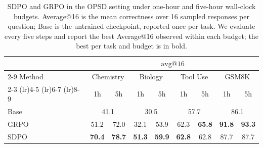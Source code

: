 \begin{table}[t]
    \centering
    \small
    \setlength{\tabcolsep}{3.5pt}
    \renewcommand{\arraystretch}{1.15}
    \caption{
    SDPO and GRPO in the OPSD setting under one-hour and five-hour wall-clock
budgets. Average@16 is the mean correctness over 16 sampled responses per
question; Base is the untrained checkpoint, reported once per task. We evaluate
every five steps and report the best Average@16 observed within each budget;
the best per task and budget is in bold.
    }
    \label{tab:self_opd_results}
    \begin{tabular}{lcccccccc}
        \toprule
        & \multicolumn{8}{c}{$\mathrm{avg@16}$} \\
        \cmidrule(lr){2-9}
        Method
        & \multicolumn{2}{c}{Chemistry}
        & \multicolumn{2}{c}{Biology}
        & \multicolumn{2}{c}{Tool Use}
        & \multicolumn{2}{c}{GSM8K} \\
        \cmidrule(lr){2-3}
        \cmidrule(lr){4-5}
        \cmidrule(lr){6-7}
        \cmidrule(lr){8-9}
        & 1h & 5h
        & 1h & 5h
        & 1h & 5h
        & 1h & 5h \\
        \midrule
        Base
        & \multicolumn{2}{c}{41.1}
        & \multicolumn{2}{c}{30.5}
        & \multicolumn{2}{c}{57.7}
        & \multicolumn{2}{c}{86.1} \\

        \midrule
        
        GRPO
        & 51.2 & 72.0
        & 32.1 & 53.9
        & 62.3 & \textbf{65.8}
        & \textbf{91.8} & \textbf{93.3} \\

        SDPO
        & \textbf{70.4} & \textbf{78.7}
        & \textbf{51.3} & \textbf{59.9}
        & \textbf{62.8} & 62.8
        & 87.7 & 87.7 \\
        \bottomrule
    \end{tabular}
\end{table}